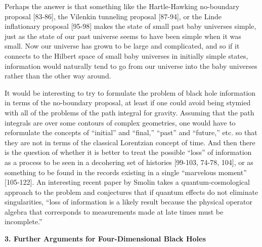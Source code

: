      Perhaps the answer is that something like
the Hartle-Hawking no-boundary proposal
[83-86],
the Vilenkin tunneling proposal
[87-94],
or the Linde inflationary proposal
[95-98]
makes the state of small past baby universes
simple, just as the state of our past universe seems to have been
simple when
it was small.  Now our universe has grown to be large and
complicated, and so
if it connects to the Hilbert space of small baby universes in
initially simple
states, information would naturally tend to go from our universe into
the baby
universes rather than the other way around.

     It would be interesting to try to formulate the problem of black
hole
information in terms of the no-boundary proposal, at least if one
could avoid
being stymied with all of the problems of the path integral for
gravity.
Assuming that the path integrals are over some contours of complex
geometries,
one would have to reformulate the concepts of ``initial'' and
``final,''
``past''
and ``future,'' etc. so that they are not in terms of the classical
Lorentzian
concept of time.  And then there is the question of whether it is
better to
treat the possible ``loss'' of information as a process to be seen in
a
decohering set of histories
[99-103, 74-78, 104],
or as something to be found in the records
existing in a single ``marvelous moment''
[105-122].
An interesting recent paper
by Smolin \cite{Smo} takes a quantum-cosmological approach to the
problem and
conjectures that if quantum effects do not eliminate singularities,
``loss of
information is a likely result because the physical operator algebra
that
corresponds to measurements made at late times must be incomplete.''

\vspace{5 mm}
{\bf 3.  Further Arguments for Four-Dimensional Black Holes}
\vspace{5 mm}

